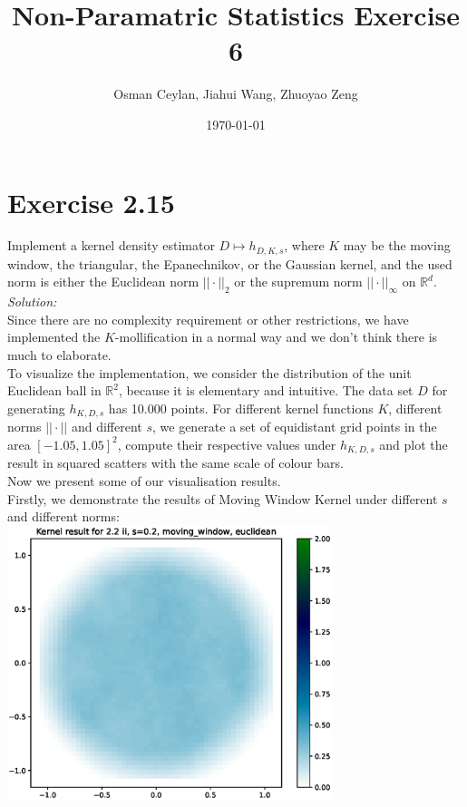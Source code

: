 \documentclass{article}
\title{Non-Paramatric Statistics Exercise 6}
\author{Osman Ceylan, Jiahui Wang, Zhuoyao Zeng}
\date{\today}
\begin{document}
\maketitle

\section*{Exercise 2.15} \vspace*{-1em}
Implement a kernel density estimator $D \mapsto h_{D,K,s}$, where $K$ may be the moving window, the triangular, the Epanechnikov, or the Gaussian kernel, and the used norm is either the Euclidean norm $||\cdot ||_2$ or the supremum norm $||\cdot ||_{\infty}$ on $\mathbb{R}^d$.\vspace*{1em} \\
\textit{Solution:} \\
Since there are no complexity requirement or other restrictions, we have  implemented the  $K$-mollification in a normal way and we don't think there is much to elaborate. \\
To visualize the implementation, we consider the distribution of the unit Euclidean ball in $\mathbb{R}^2$, because it is elementary and intuitive. The data set $D$ for generating $h_{K,D,s}$ has  10.000 points. For different kernel functions $K$, different norms $||\cdot ||$ and different $s$, we generate a set of equidistant grid points in the area $[-1.05 , 1.05]^2$, compute their respective values under $h_{K,D,s}$ and plot the result in squared scatters with the same scale of colour bars. \vspace*{1em}\\
Now we present some of our visualisation results. \\
Firstly, we demonstrate the results of Moving Window Kernel under different $s$ and different norms: \\
\iffalse
\hspace*{-1.5cm}\includegraphics[height=8cm]{comparisons//Kernel_result_2-2ii_s_0-2_moving_window_euclidean.eps} \hspace*{-1.5cm}
\end{document}
